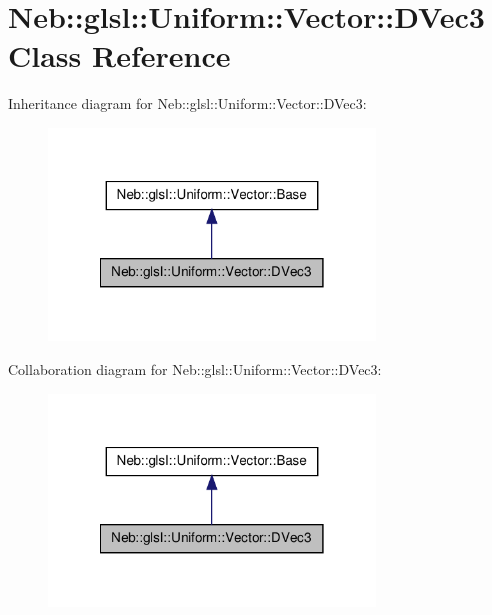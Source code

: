 \hypertarget{classNeb_1_1glsl_1_1Uniform_1_1Vector_1_1DVec3}{\section{\-Neb\-:\-:glsl\-:\-:\-Uniform\-:\-:\-Vector\-:\-:\-D\-Vec3 \-Class \-Reference}
\label{classNeb_1_1glsl_1_1Uniform_1_1Vector_1_1DVec3}
}


\-Inheritance diagram for \-Neb\-:\-:glsl\-:\-:\-Uniform\-:\-:\-Vector\-:\-:\-D\-Vec3\-:\nopagebreak
\begin{figure}[H]
\begin{center}
\leavevmode
\includegraphics[width=246pt]{classNeb_1_1glsl_1_1Uniform_1_1Vector_1_1DVec3__inherit__graph}
\end{center}
\end{figure}


\-Collaboration diagram for \-Neb\-:\-:glsl\-:\-:\-Uniform\-:\-:\-Vector\-:\-:\-D\-Vec3\-:\nopagebreak
\begin{figure}[H]
\begin{center}
\leavevmode
\includegraphics[width=246pt]{classNeb_1_1glsl_1_1Uniform_1_1Vector_1_1DVec3__coll__graph}
\end{center}
\end{figure}
